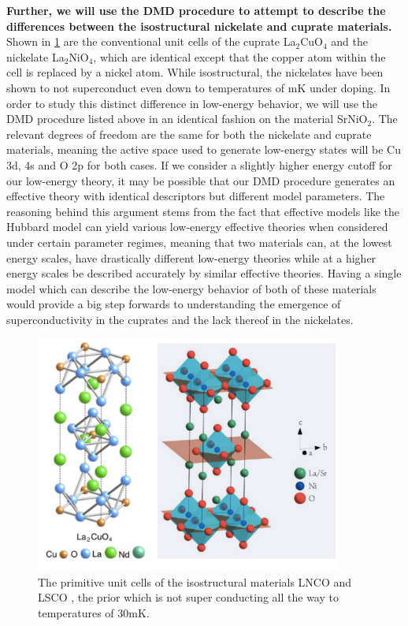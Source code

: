 \documentclass{article}
\begin{document}
\textbf{Further, we will use the DMD procedure to attempt to describe the differences between the isostructural nickelate and cuprate materials. }
Shown in \ref{fig6} are the conventional unit cells of the cuprate La$_2$CuO$_4$ and the nickelate La$_2$NiO$_4$, which are identical except that the copper atom within the cell is replaced by a nickel atom. 
While isostructural, the nickelates have been shown to not superconduct even down to temperatures of mK \cite{PhysRevB.43.1229} under doping. 
In order to study this distinct difference in low-energy behavior, we will use the DMD procedure listed above in an identical fashion on the material SrNiO$_2$. 
The relevant degrees of freedom are the same for both the nickelate and cuprate materials, meaning the active space used to generate low-energy states will be Cu 3d, 4s and O 2p for both cases. 
If we consider a slightly higher energy cutoff for our low-energy theory, it may be possible that our DMD procedure generates an effective theory with identical descriptors but different model parameters. 
The reasoning behind this argument stems from the fact that effective models like the Hubbard model can yield various low-energy effective theories when considered under certain parameter regimes, meaning that two materials can, at the lowest energy scales, have drastically different low-energy theories while at a higher energy scales be described accurately by similar effective theories. 
Having a single model which can describe the low-energy behavior of both of these materials would provide a big step forwards to understanding the emergence of superconductivity in the cuprates and the lack thereof in the nickelates. 

\begin{figure}[H]
\centering
\includegraphics[width=0.9\textwidth]{Figures/P2-Ni_Cu.pdf}
\caption{\label{fig6} The primitive unit cells of the isostructural materials LNCO \cite{PhysRevB.92.205114} and LSCO \cite{Scalapino2012}, the prior which is not super conducting all the way to temperatures of 30mK.}
\end{figure}


 

 
 
\end{document}
